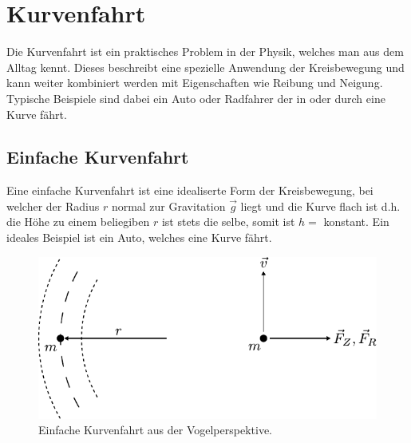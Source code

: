 



\chapter{Kurvenfahrt}

Die Kurvenfahrt ist ein praktisches Problem in der Physik, welches man
aus dem Alltag kennt. Dieses beschreibt eine spezielle Anwendung der
Kreisbewegung und kann weiter kombiniert werden mit Eigenschaften wie
Reibung und Neigung. Typische Beispiele sind dabei ein Auto oder 
Radfahrer der in oder durch eine Kurve fährt.

\newpage
\section{Einfache Kurvenfahrt}
Eine einfache Kurvenfahrt ist eine idealiserte Form der Kreisbewegung,
bei welcher der Radius $r$ normal zur Gravitation $\vec{g}$ liegt und
die Kurve flach ist d.h. die Höhe zu einem beliegiben $r$ ist stets die
selbe, somit ist $h=$ konstant. 
Ein ideales Beispiel ist ein Auto, welches eine Kurve fährt.

\begin{figure}[h!]
	\centering
	\includegraphics[scale=0.8]{../fig/kurve3.pdf}
	\caption{Einfache Kurvenfahrt aus der Vogelperspektive.}
	\label{fig:kurvenfahrt}
\end{figure}

